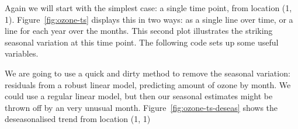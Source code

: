 \documentclass{scrartcl}
\begin{document}
%


Again we will start with the simplest case: a single time point, from location (1, 1).  Figure~\ref{fig:ozone-ts} displays this in two ways: as a single line over time, or a line for each year over the months.  This second plot illustrates the striking seasonal variation at this time point.  The following code sets up some useful variables.

% 


% 


We are going to use a quick and dirty method to remove the seasonal variation: residuals from a robust linear model, predicting amount of ozone by month.  We could use a regular linear model, but then our seasonal estimates might be thrown off by an very unusual month.  Figure~\ref{fig:ozone-ts-deseas} shows the deseasonalised trend from location (1, 1)

% 
%


%

\end{document}
